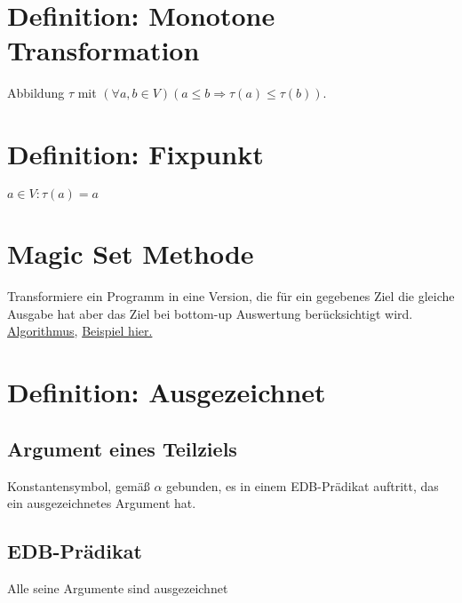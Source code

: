 \documentclass[12pt, a4paper]{article}
\begin{document}
\section*{Definition: Monotone Transformation}
Abbildung $\tau$ mit $(\forall a,b \in V) (a \le b \Rightarrow \tau(a) \le \tau(b))$.
 
\section*{Definition: Fixpunkt}
$a \in V: \tau(a) = a$

\section*{Magic Set Methode}
Transformiere ein Programm in eine Version, die für ein gegebenes Ziel die gleiche Ausgabe hat aber das Ziel bei bottom-up Auswertung berücksichtigt wird. \href{http://www.is.informatik.uni-kiel.de/~hjk/Datenbanktheorie/Magic_set.pdf}{Algorithmus}, \href{http://www.is.informatik.uni-kiel.de/~hjk/Datenbanktheorie/Magic_Beispiel.pdf}{Beispiel hier.}

\section*{Definition: Ausgezeichnet}
\subsection*{Argument eines Teilziels}
Konstantensymbol, gemäß $\alpha$ gebunden, es in einem EDB-Prädikat auftritt, das ein ausgezeichnetes Argument hat.

\subsection*{EDB-Prädikat}
Alle seine Argumente sind ausgezeichnet
\end{document}
